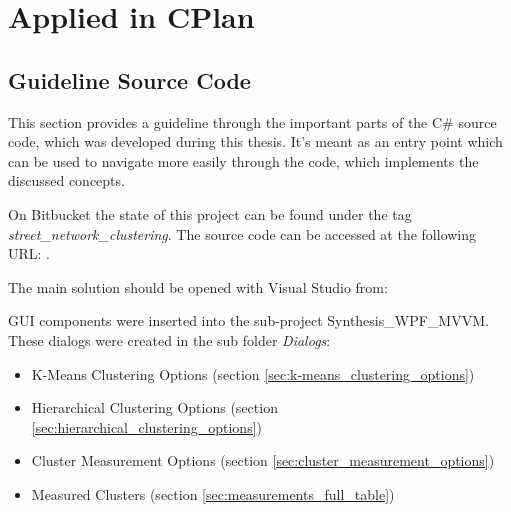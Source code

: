 \appendix
\chapter{Applied in CPlan}
\section{Guideline Source Code}
This section provides a guideline through the important parts of the C\# source code, which was developed during this thesis. It's meant as an entry point which can be used to navigate more easily through the code, which implements the discussed concepts.

On Bitbucket the state of this project can be found under the tag \\ \textit{street\_network\_clustering}.
The source code can be accessed at the following URL:  .

The main solution should be opened with Visual Studio from: 

\gls{GUI} components were inserted into the sub-project Synthesis\_WPF\_MVVM. These dialogs were created in the sub folder \textit{Dialogs}:

\begin{itemize}
    \item K-Means Clustering Options (section \ref{sec:k-means_clustering_options})
    \item Hierarchical Clustering Options (section \ref{sec:hierarchical_clustering_options})
    \item Cluster Measurement Options (section \ref{sec:cluster_measurement_options})
    \item Measured Clusters (section \ref{sec:measurements_full_table})
\end{itemize}

